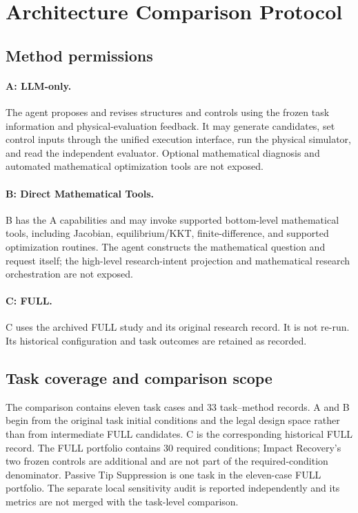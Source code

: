 \section{Architecture Comparison Protocol}
\label{app:abc-protocol}

\subsection{Method permissions}

\paragraph{A: LLM-only.}
The agent proposes and revises structures and controls using the frozen task information and physical-evaluation feedback. It may generate candidates, set control inputs through the unified execution interface, run the physical simulator, and read the independent evaluator. Optional mathematical diagnosis and automated mathematical optimization tools are not exposed.

\paragraph{B: Direct Mathematical Tools.}
B has the A capabilities and may invoke supported bottom-level mathematical tools, including Jacobian, equilibrium/KKT, finite-difference, and supported optimization routines. The agent constructs the mathematical question and request itself; the high-level research-intent projection and mathematical research orchestration are not exposed.

\paragraph{C: \softrobotagent{} FULL.}
C uses the archived FULL study and its original research record. It is not re-run. Its historical configuration and task outcomes are retained as recorded.

\subsection{Task coverage and comparison scope}

The comparison contains eleven task cases and 33 task--method records. A and B begin from the original task initial conditions and the legal design space rather than from intermediate FULL candidates. C is the corresponding historical FULL record. The FULL portfolio contains 30 required conditions; Impact Recovery's two frozen controls are additional and are not part of the required-condition denominator. Passive Tip Suppression is one task in the eleven-case FULL portfolio. The separate local sensitivity audit is reported independently and its metrics are not merged with the task-level comparison.

